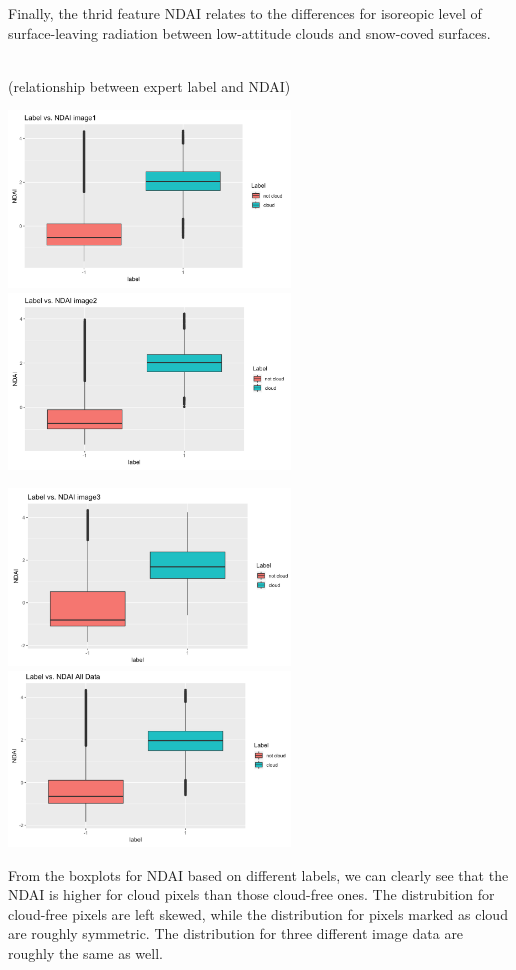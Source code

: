 \documentclass[11pt]{article}
\begin{document}
Finally, the thrid feature NDAI relates to the differences for isoreopic level of surface-leaving radiation between low-attitude clouds and snow-coved surfaces.

\mbox{}\\
(relationship between expert label and NDAI)

\includegraphics[width = 7.5cm]{1(c)image12.png}
\includegraphics[width = 7.5cm]{1(c)image13.png}

\includegraphics[width = 7.5cm]{1(c)image14.png}
\includegraphics[width = 7.5cm]{1(c)image15.png}

From the boxplots for NDAI based on different labels, we can clearly see that the NDAI is higher for cloud pixels than those cloud-free ones. The distrubition for cloud-free pixels are left skewed, while the distribution for pixels marked as cloud are roughly symmetric. The distribution for three different image data are roughly the same as well.
\end{document}
